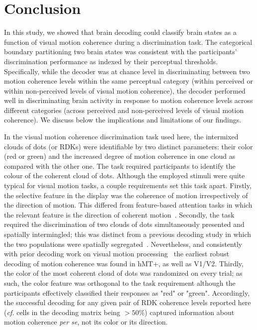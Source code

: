 \section{Conclusion}
In this study, we showed that brain decoding could classify brain states as a function of visual motion coherence during a discrimination task. The categorical boundary partitioning two brain states was consistent with the participants' discrimination performance as indexed by their perceptual thresholds. Specifically, while the decoder was at chance level in discriminating between two motion coherence levels within the same perceptual category (within perceived or within non-perceived levels of visual motion coherence), the decoder performed well in discriminating brain activity in response to motion coherence levels across different categories (across perceived and non-perceived levels of visual motion coherence). We discuss below the implications and limitations of our findings.

In the visual motion coherence discrimination task used here, the intermixed clouds of dots (or RDKs) were identifiable by two distinct parameters: their color (red or green) and the increased degree of motion coherence in one cloud as compared with the other one. The task required participants to identify the colour of the coherent cloud of dots. Although the employed stimuli were quite typical for visual motion tasks, a couple requirements set this task apart. Firstly, the selective feature in the display was the coherence of motion irrespectively of the direction of motion. This differed from feature-based attention tasks in which the relevant feature is the direction of coherent motion~\cite{31treue1999feature,32saproo2014attention}. Secondly, the task required the discrimination of two clouds of dots simultaneously presented and spatially intermingled; this was distinct from a previous decoding study in which the two populations were spatially segregated~\cite{14serences2007representation}. Nevertheless, and consistently with prior decoding work on visual motion processing~\cite{5kamitani2005decoding,13kamitani2006decoding,14serences2007representation,15hogendoorn2013decoding,16van2014decoding} the earliest robust decoding of motion coherence was found in hMT+, as well as V1/V2. Thirdly, the color of the most coherent cloud of dots was randomized on every trial; as such, the color feature was orthogonal to the task requirement although the participants effectively classified their responses as "red" or "green". Accordingly, the successful decoding for any given pair of RDK coherence levels reported here (\textit{cf.} cells in the decoding matrix being $>50\%$) captured information about motion coherence \textit{per se}, not its color or its direction.


